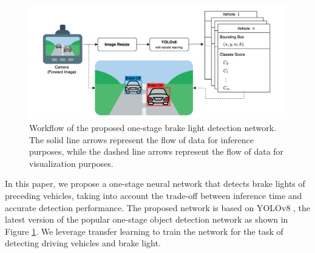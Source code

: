 
\begin{figure}[]
    \includegraphics[scale=0.5]{fig/workflow.png}
    \caption{Workflow of the proposed one-stage brake light detection network. The solid line arrows represent the flow of data for inference purposes, while the dashed line arrows represent the flow of data for visualization purposes.}
    \label{fig:workflow}
\end{figure}

In this paper, we propose a one-stage neural network that detects brake lights of preceding vehicles, taking into account the trade-off between inference time and accurate detection performance. 
The proposed network is based on YOLOv8 \cite{YOLOv8}, the latest version of the popular one-stage object detection network as shown in Figure \ref{fig:workflow}.
We leverage transfer learning to train the network for the task of detecting driving vehicles and brake light.

